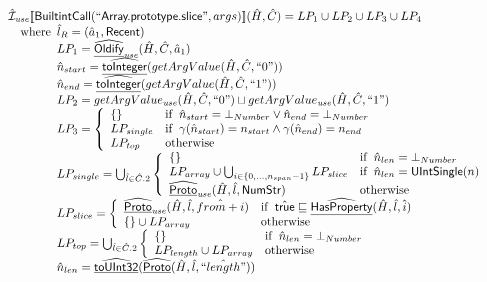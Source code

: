 \[\begin{array}{l}
\hat{\mathcal{I}}_{\it use}\llbracket \mbox{\textsf{BuiltintCall}}(``\mbox{\textsf{Array.prototype.slice}}",args)\rrbracket(\hat{H},\hat{C}) = LP_1 \cup LP_2 \cup LP_3 \cup LP_4\\
\quad{\rm where}\begin{array}[t]{l}
  \hat{l}_R = (\hat{a}_1, \mbox{\textsf{Recent}})\\
  LP_1 = \widehat{\underline{\sf Oldify}}_{\it use}(\hat{H},\hat{C}, \hat{a}_1)\\
  \hat{n}_{start} = \widehat{\underline{\sf toInteger}}(getArgValue(\hat{H},\hat{C}, ``0"))\\
  \hat{n}_{end} = \widehat{\underline{\sf toInteger}}(getArgValue(\hat{H},\hat{C}, ``1"))\\
  LP_2 = getArgValue_{\it use}(\hat{H},\hat{C}, ``0") \sqcup getArgValue_{\it use}(\hat{H},\hat{C}, ``1")\\
  LP_3 = \left\{\begin{array}{ll}
      \left\{\begin{array}{l}\end{array}\right\} & {\rm if}\begin{array}[t]{l}\hat{n}_{start} = \bot_{Number} \lor \hat{n}_{end} = \bot_{Number}\end{array}\\
      LP_{single} & {\rm if}\begin{array}[t]{l}\gamma(\hat{n}_{start}) = n_{start} \land \gamma(\hat{n}_{end}) = n_{end} \end{array}\\
      LP_{top} & {\rm otherwise}
    \end{array}\right.\\
  LP_{single} = \bigcup_{\hat{l} \in \hat{C}.2} \left\{\begin{array}{ll}
      \left\{\begin{array}{l}\end{array}\right\} & {\rm if}\begin{array}[t]{l}\hat{n}_{len} = \bot_{Number}\end{array}\\
      LP_{array} \cup \bigcup_{i \in \{0,...,n_{span}-1\}} LP_{slice}
      & {\rm if}\begin{array}[t]{l}\hat{n}_{len} = \mbox{\textsf{UIntSingle}}(n)\end{array}\\
      \widehat{\underline{\sf Proto}}_{\it use}(\hat{H}, \hat{l}, \mbox{\textsf{NumStr}}) & {\rm otherwise}
    \end{array}\right.\\
  LP_{slice} = \left\{\begin{array}{ll}
      \widehat{\underline{\sf Proto}}_{\it use}(\hat{H}, \hat{l}, \hat{from+i})
      & {\rm if}\begin{array}[t]{l}\hat{\mbox{\textsf{true}}} \sqsubseteq \widehat{\underline{\sf HasProperty}}(\hat{H}, \hat{l}, \hat{i})\end{array}\\
      \left\{\begin{array}{l}\end{array}\right\} \cup LP_{array} & {\rm otherwise}
    \end{array}\right.\\
  LP_{top} = \bigcup_{\hat{l} \in \hat{C}.2} \left\{\begin{array}{ll}
      \left\{\begin{array}{l}\end{array}\right\} & {\rm if}\begin{array}[t]{l}\hat{n}_{len} = \bot_{Number}\end{array}\\
      LP_{length} \cup LP_{array} & {\rm otherwise}
    \end{array}\right.\\
  \hat{n}_{len} = \widehat{\underline{\sf toUInt32}}(\widehat{\underline{\sf Proto}}(\hat{H}, \hat{l}, \hat{``length"}))\\
\end{array}
\end{array}\]
